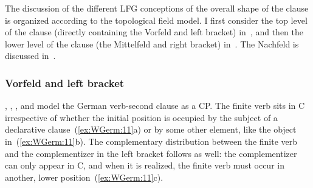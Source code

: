 \documentclass[output=paper,hidelinks]{langscibook}
\begin{document}
The discussion of the different LFG conceptions of the overall
shape of the clause is organized according to the topological field
model. I first consider the top level of the clause
(directly containing the Vorfeld and left bracket)
in~, and then the lower level of the clause (the Mittelfeld and right bracket) in~. The Nachfeld
is discussed in~.

\subsubsection{Vorfeld and left bracket\label{sec:Germanic:vflb}}

\citet{berman-frank:1996}, \citet{Choi1999},
\citet{Berman2003}, and \citet{frank:2006} model the
German verb-second clause as a CP. The finite verb sits in C irrespective of
whether the initial position is occupied by the subject of a
declarative clause~(\ref{ex:WGerm:11}a) or by some other element, like the object in~(\ref{ex:WGerm:11}b). The
complementary distribution between the finite verb and the
complementizer in the left bracket follows as well: the complementizer can
only appear in C, and when it is realized, the finite verb must occur
in another, lower position~(\ref{ex:WGerm:11}c).
%
\newcommand{\gllx}{}
%
\end{document}

